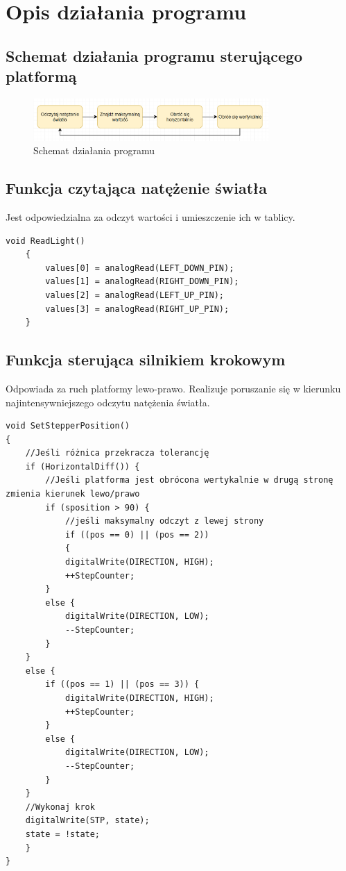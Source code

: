 \documentclass[10pt, a4paper]{article}
\begin{document}
\section{Opis działania programu}

\subsection{Schemat działania programu sterującego platformą}
	\begin{figure}[H]
		\centering
		\includegraphics[width=0.8\textwidth]{figures/diagramplatforma.png}
		\caption{Schemat działania programu}
		\label{fig:diagramPlatforma}
	\end{figure}

\subsection{Funkcja czytająca natężenie światła}
Jest odpowiedzialna za odczyt wartości i umieszczenie ich w tablicy.
	\begin{lstlisting}[tabsize=2]
	void ReadLight()
	{
		values[0] = analogRead(LEFT_DOWN_PIN);
		values[1] = analogRead(RIGHT_DOWN_PIN);
		values[2] = analogRead(LEFT_UP_PIN);
		values[3] = analogRead(RIGHT_UP_PIN);
	}
	\end{lstlisting}

\subsection{Funkcja sterująca silnikiem krokowym}
Odpowiada za ruch platformy lewo-prawo. Realizuje poruszanie się w kierunku najintensywniejszego odczytu natężenia światła.
\begin{lstlisting}[tabsize=2]
void SetStepperPosition()
{
	//Jeśli różnica przekracza tolerancję
	if (HorizontalDiff()) {
		//Jeśli platforma jest obrócona wertykalnie w drugą stronę zmienia kierunek lewo/prawo
		if (sposition > 90) {
			//jeśli maksymalny odczyt z lewej strony
			if ((pos == 0) || (pos == 2))
			{
			digitalWrite(DIRECTION, HIGH);
			++StepCounter;
		}
		else {
			digitalWrite(DIRECTION, LOW);
			--StepCounter;
		}
	}
	else {
		if ((pos == 1) || (pos == 3)) {
			digitalWrite(DIRECTION, HIGH);
			++StepCounter;
		}
		else {
			digitalWrite(DIRECTION, LOW);
			--StepCounter;
		}
	}
	//Wykonaj krok
	digitalWrite(STP, state);
	state = !state;
	}
}
\end{lstlisting}
\end{document}
